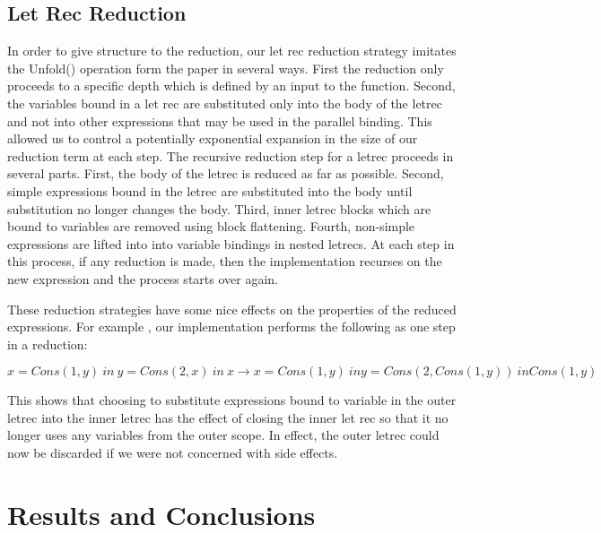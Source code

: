 \documentclass[preprint]{sigplanconf}
\begin{document}
\subsection{Let Rec Reduction}
In order to give structure to the reduction, our let rec reduction strategy imitates the Unfold() operation form the paper in several ways.  First the reduction only proceeds to a specific depth which is defined by an input to the function.  Second, the variables bound in a let rec are substituted only into the body of the letrec and not into other expressions that may be used in the parallel binding.  This allowed us to control a potentially exponential expansion in the size of our reduction term at each step.  The recursive reduction step for a letrec proceeds in several parts.  First, the body of the letrec is reduced as far as possible.  Second, simple expressions bound in the letrec are substituted into the body until substitution no longer changes the body. Third, inner letrec blocks which are bound to variables are removed using block flattening.  Fourth, non-simple expressions are lifted into into variable bindings in nested letrecs. At each step in this process, if any reduction is made, then the implementation recurses on the new expression and the process starts over again.

These reduction strategies have some nice effects on the properties of the reduced expressions.  For example , our implementation performs the following as one step in a reduction:
\begin{center}
${x=Cons(1,y)\ in\ {y=Cons(2,x)\ in\ x}} \rightarrow 
{x=Cons(1,y)\ in {y=Cons(2,Cons(1,y))\ in Cons(1,y)}}$
\end{center}

This shows that choosing to substitute expressions bound to variable in the outer letrec into the inner letrec has the effect of closing the inner let rec so that it no longer uses any variables from the outer scope.  In effect, the outer letrec could now be discarded if we were not concerned with side effects.

\section{Results and Conclusions}





\end{document}
